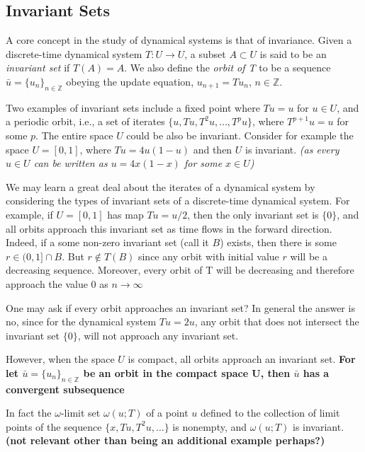 \documentclass[12 pt]{article}
\begin{document}
\subsection{Invariant Sets}

A core concept in the study of dynamical systems is that of invariance. Given a discrete-time dynamical system $T: U \to U$, a subset $A \subset U$ is said to be an \emph{invariant set} if $T(A) =A$. 
We also define the \emph{orbit of T} to be a sequence $\bar{u} = \{u_n\}_{n\in \mathbb{Z}}$ obeying the update equation, $u_{n+1}=Tu_n$, $n \in \mathbb{Z}$. 


Two examples of invariant sets include a fixed point where $Tu=u$ for  $u\in U$, and a periodic orbit, i.e., a set of iterates $\{u,Tu, T^2u,\ldots,T^pu\}$, where $T^{p+1}u=u$ for some $p$.  The entire space $U$ could be also be invariant.
Consider for example the space $U=[0,1]$, where $Tu=4u(1-u)$ and then $U$ is invariant. \emph{(as every $u\in{U}$ can be written as $u = 4x(1-x)$ for some $x\in{U}$)}

We may learn a great deal about the iterates of a dynamical system by considering the types of invariant sets of a discrete-time dynamical system.  For example, if $U=[0,1]$ has map $Tu= u/2$, then the only invariant set is $\{0\}$, and all orbits approach this invariant set as time flows in the forward direction. 
Indeed, if a some non-zero invariant set (call it $B$) exists, then there is  some $r\in(0,1]\cap{B}$. But $r\notin{T(B)}$ since any orbit with initial value $r$ will be a decreasing sequence. Moreover, every orbit of T will be decreasing and therefore approach the value $0$ as $n\rightarrow\infty$

One may ask if every orbit approaches an invariant set? In general the answer is no, since for the dynamical system $Tu=2u$, any orbit that does not intersect the invariant set $\{0\}$, will not approach any invariant set. 

However,  when the space $U$ is compact, all orbits approach an invariant set. \textbf{For let $\bar{u} = \{u_n\}_{n\in \mathbb{Z}}$ be an orbit in the compact space U, then $\bar{u}$ has a convergent subsequence }

In fact the $\omega$-limit set $\omega(u;T)$ of a point $u$ defined to the collection of limit points of the sequence $\{x,Tu,T^2u,\ldots\}$ is nonempty, and $\omega(u;T)$ is invariant. \textbf{(not relevant other than being an additional example perhaps?)}
\end{document}
